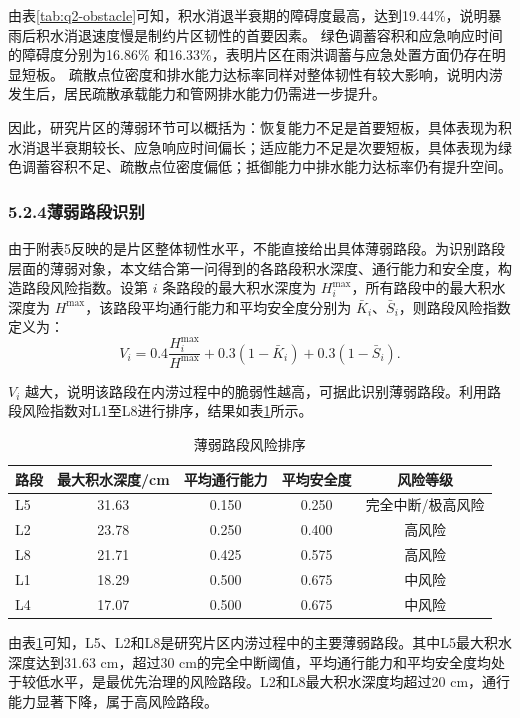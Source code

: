 \documentclass[UTF8,a4paper,12pt]{ctexart}
\begin{document}
由表\ref{tab:q2-obstacle}可知，积水消退半衰期的障碍度最高，达到19.44\%，说明暴雨后积水消退速度慢是制约片区韧性的首要因素。
绿色调蓄容积和应急响应时间的障碍度分别为16.86\%
和16.33\%，表明片区在雨洪调蓄与应急处置方面仍存在明显短板。
疏散点位密度和排水能力达标率同样对整体韧性有较大影响，说明内涝发生后，居民疏散承载能力和管网排水能力仍需进一步提升。

因此，研究片区的薄弱环节可以概括为：恢复能力不足是首要短板，具体表现为积水消退半衰期较长、应急响应时间偏长；适应能力不足是次要短板，具体表现为绿色调蓄容积不足、疏散点位密度偏低；抵御能力中排水能力达标率仍有提升空间。

\subsubsection{5.2.4薄弱路段识别}

由于附表5反映的是片区整体韧性水平，不能直接给出具体薄弱路段。为识别路段层面的薄弱对象，本文结合第一问得到的各路段积水深度、通行能力和安全度，构造路段风险指数。设第 \(i\) 条路段的最大积水深度为 \(H_i^{\max}\)，所有路段中的最大积水深度为 \(H^{\max}\)，该路段平均通行能力和平均安全度分别为 \(\bar K_i\)、\(\bar S_i\)，则路段风险指数定义为：
\[
V_i=0.4\frac{H_i^{\max}}{H^{\max}}+0.3(1-\bar K_i)+0.3(1-\bar S_i).
\]

\(V_i\) 越大，说明该路段在内涝过程中的脆弱性越高，可据此识别薄弱路段。利用路段风险指数对L1至L8进行排序，结果如表\ref{tab:q2-road-risk}所示。

\begin{table}[H]
\centering
\caption{薄弱路段风险排序}
\label{tab:q2-road-risk}
\begin{tabular}{lcccc}
\toprule
路段 & 最大积水深度/cm & 平均通行能力 & 平均安全度 & 风险等级 \\
\midrule
L5 & 31.63 & 0.150 & 0.250 & 完全中断/极高风险 \\
L2 & 23.78 & 0.250 & 0.400 & 高风险 \\
L8 & 21.71 & 0.425 & 0.575 & 高风险 \\
L1 & 18.29 & 0.500 & 0.675 & 中风险 \\
L4 & 17.07 & 0.500 & 0.675 & 中风险 \\
\bottomrule
\end{tabular}
\end{table}

由表\ref{tab:q2-road-risk}可知，L5、L2和L8是研究片区内涝过程中的主要薄弱路段。其中L5最大积水深度达到31.63 cm，超过30 cm的完全中断阈值，平均通行能力和平均安全度均处于较低水平，是最优先治理的风险路段。L2和L8最大积水深度均超过20 cm，通行能力显著下降，属于高风险路段。
\end{document}
